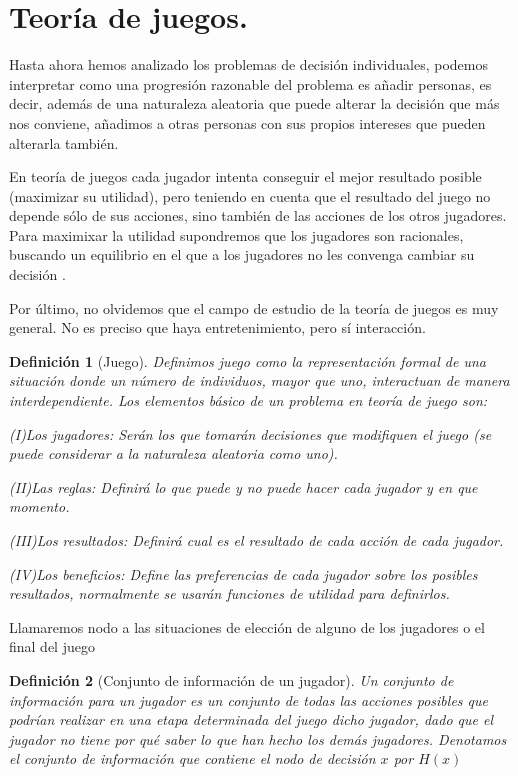 \documentclass[a4paper]{report} %
\newtheorem{definicion}{Definición}[section]
\begin{document}
\section{Teoría de juegos.}


Hasta ahora hemos analizado los problemas de decisión individuales, podemos interpretar como una progresión razonable del problema es añadir personas, es decir, además de una naturaleza aleatoria que puede alterar la decisión que más nos conviene, añadimos a otras personas con sus propios intereses que pueden alterarla también.

En teoría de juegos cada jugador intenta conseguir el mejor resultado posible (maximizar su utilidad), pero teniendo en cuenta que el resultado del juego no depende sólo de sus acciones, sino también de las acciones de los otros jugadores. Para maximixar la utilidad supondremos que los jugadores son racionales, buscando un equilibrio en el que a los jugadores no les convenga cambiar su decisión .


Por último, no olvidemos que el campo de estudio de la teoría de juegos es muy general. No es preciso que haya entretenimiento, pero sí interacción.
\begin{definicion}[Juego]
Definimos juego como la representación formal de una situación donde un número de individuos, mayor que uno, interactuan de manera interdependiente.
Los elementos básico de un problema en teoría de juego son:

(I)Los jugadores: Serán los que tomarán decisiones que modifiquen el juego (se puede considerar a la naturaleza aleatoria como uno).

(II)Las reglas: Definirá lo que puede y no puede hacer cada jugador y en que momento.

(III)Los resultados: Definirá cual es el resultado de cada acción de cada jugador.

(IV)Los beneficios: Define las preferencias de cada jugador sobre los posibles resultados, normalmente se usarán funciones de utilidad para definirlos.

\end{definicion}


Llamaremos nodo a las situaciones de elección de alguno de los jugadores o el final del juego

\begin{definicion}[Conjunto de información de un jugador]
Un conjunto de información para un jugador es un conjunto de todas las acciones posibles que podrían realizar en una etapa determinada del juego dicho jugador, dado que el jugador no tiene por qué saber lo que han hecho los demás jugadores. Denotamos el conjunto de información que contiene el nodo de decisión $x$ por $H(x)$
\end{definicion}
\end{document}
